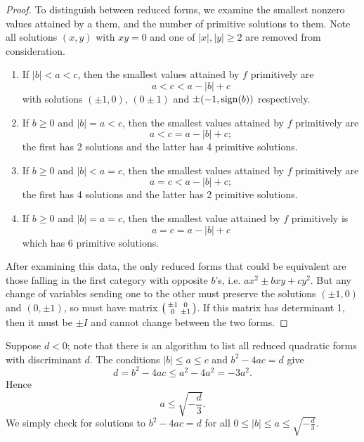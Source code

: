 \begin{proof}
 To distinguish between reduced forms, we examine the smallest nonzero values attained by a them, and the number of primitive solutions to them. Note all solutions $(x,y)$ with $xy=0$ and one of $|x|,|y|\ge 2$ are removed from consideration.
\begin{enumerate}
\item If $|b|<a<c$, then the smallest values attained by $f$ primitively are
\[
a<c<a-|b|+c
\]
with solutions $(\pm1,0)$, $(0\pm 1)$ and $\pm (-1,\operatorname{sign}(b))$ respectively.
\item If $b\ge 0$ and $|b|=a<c$, then the smallest values attained by $f$ primitively are
\[
a<c=a-|b|+c;
\]
the first has 2 solutions and the latter has 4 primitive solutions.
\item If $b\ge 0$ and $|b|<a=c$, then the smallest values attained by $f$ primitively are
\[
a=c<a-|b|+c;
\]
the first has 4 solutions and the latter has 2 primitive solutions.
\item If $b\ge 0$ and $|b|=a=c$, then the smallest value attained by $f$ primitively is 
\[
a=c=a-|b|+c
\]
which has 6 primitive solutions.
\end{enumerate}
After examining this data, the only reduced forms that could be equivalent are those falling in the first category with opposite $b$'s, i.e. $ax^2\pm bxy+cy^2$. But any change of variables sending one to the other must preserve the solutions $(\pm 1,0)$ and $(0,\pm1)$, so must have matrix $\left(\begin{smallmatrix} {\pm1}&{0}\\ {0}&{\pm1} \end{smallmatrix}\right)$. If this matrix has determinant 1, then it must be $\pm I$ and cannot change between the two forms.
\end{proof}
Suppose $d<0$; note that there is an algorithm to list all reduced quadratic forms with discriminant $d$. The conditions $|b|\le a\le c$ and $b^2-4ac=d$ give
\[
d=b^2-4ac \le a^2-4a^2=-3a^2.
\]
Hence
\[
a\le \sqrt{-\frac{d}{3}}.
\]
We simply check for solutions to $b^2-4ac=d$ for all $0\le |b|\le a\le\sqrt{-\frac{d}{3}}$.

